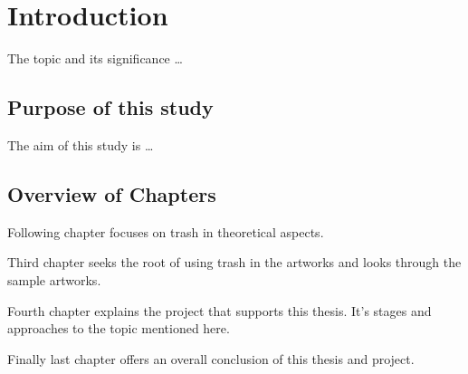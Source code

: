 \chapter{Introduction}




The topic and its significance \ldots

\section{Purpose of this study}
The aim of this study is \ldots

\section{Overview of Chapters}
Following chapter focuses on trash in theoretical aspects.

Third chapter seeks the root of using trash in the artworks and looks through the sample artworks.

Fourth chapter explains the project that supports this thesis. It's stages and approaches to the topic mentioned here.

Finally last chapter offers an overall conclusion of this thesis and project.







